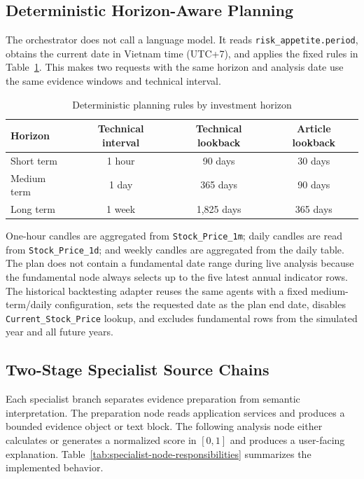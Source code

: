 \subsection{Deterministic Horizon-Aware Planning}
\label{subsec:analysis-orchestrator-planning}

The orchestrator does not call a language model. It reads \texttt{risk\_appetite.period}, obtains the current date in Vietnam time (UTC+7), and applies the fixed rules in Table~\ref{tab:analysis-plan-rules}. This makes two requests with the same horizon and analysis date use the same evidence windows and technical interval.

\begin{table}[H]
    \centering
    \caption{Deterministic planning rules by investment horizon}
    \label{tab:analysis-plan-rules}
    \small
    \renewcommand{\arraystretch}{1.2}
    \begin{tabular}{lccc}
        \toprule
        \textbf{Horizon} & \textbf{Technical interval} & \textbf{Technical lookback} & \textbf{Article lookback} \\
        \midrule
        Short term & 1 hour & 90 days & 30 days \\
        Medium term & 1 day & 365 days & 90 days \\
        Long term & 1 week & 1,825 days & 365 days \\
        \bottomrule
    \end{tabular}
\end{table}

One-hour candles are aggregated from \texttt{Stock\_Price\_1m}; daily candles are read from \texttt{Stock\_Price\_1d}; and weekly candles are aggregated from the daily table. The plan does not contain a fundamental date range during live analysis because the fundamental node always selects up to the five latest annual indicator rows. The historical backtesting adapter reuses the same agents with a fixed medium-term/daily configuration, sets the requested date as the plan end date, disables \texttt{Current\_Stock\_Price} lookup, and excludes fundamental rows from the simulated year and all future years.

\subsection{Two-Stage Specialist Source Chains}
\label{subsec:analysis-specialist-nodes}

Each specialist branch separates evidence preparation from semantic interpretation. The preparation node reads application services and produces a bounded evidence object or text block. The following analysis node either calculates or generates a normalized score in $[0,1]$ and produces a user-facing explanation. Table~\ref{tab:specialist-node-responsibilities} summarizes the implemented behavior.

